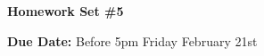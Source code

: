 


\thispagestyle{fancy}






\begin{center}
{\huge \textbf{Homework Set \#5}}
\large

{\textbf{ Due Date:} Before 5pm Friday February 21st   } 
\end{center}

